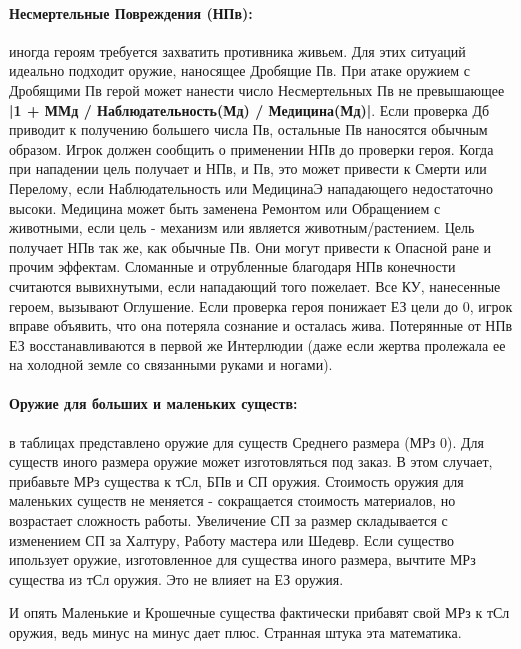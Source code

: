 \paragraph{Несмертельные Повреждения (НПв):} иногда героям требуется захватить противника живьем. Для этих ситуаций идеально подходит оружие, наносящее Дробящие Пв. 
\newline При атаке оружием с Дробящими Пв герой может нанести число Несмертельных Пв не превышающее \textbf{|1 + ММд / Наблюдательность(Мд) / Медицина(Мд)|}. Если проверка Дб приводит к получению большего числа Пв, остальные Пв наносятся обычным образом. Игрок должен сообщить о применении НПв до проверки героя.
\newline Когда при нападении цель получает и НПв, и Пв, это может привести к Смерти или Перелому, если Наблюдательность или  МедицинаЭ нападающего недостаточно высоки.
\newline Медицина может быть заменена Ремонтом или Обращением с животными, если цель - механизм или является животным/растением.
\newline Цель получает НПв так же, как обычные Пв. Они могут привести к Опасной ране и прочим эффектам. Сломанные и отрубленные благодаря НПв конечности считаются вывихнутыми, если нападающий того пожелает. Все КУ, нанесенные героем, вызывают Оглушение. Если проверка героя понижает ЕЗ цели до 0, игрок вправе объявить, что она потеряла сознание и осталась жива. Потерянные от НПв ЕЗ восстанавливаются в первой же Интерлюдии (даже если жертва пролежала ее на холодной земле со связанными руками и ногами).

\paragraph{Оружие для больших и маленьких существ:} в таблицах представлено оружие для существ Среднего размера (МРз 0). Для существ иного размера оружие может изготовляться под заказ. 
\newline В этом случает, прибавьте МРз существа к тСл, БПв и СП оружия. Стоимость оружия для маленьких существ не меняется - сокращается стоимость материалов, но возрастает сложность работы. Увеличение СП за размер складывается с изменением СП за Халтуру, Работу мастера или Шедевр.
\newline Если существо ипользует оружие, изготовленное для существа иного размера, вычтите МРз существа из тСл оружия. Это не влияет на ЕЗ оружия.
\begin{tcolorbox}
    И опять Маленькие и Крошечные существа фактически прибавят свой МРз к тСл оружия, ведь минус на минус дает плюс. Странная штука эта математика.
\end{tcolorbox}

